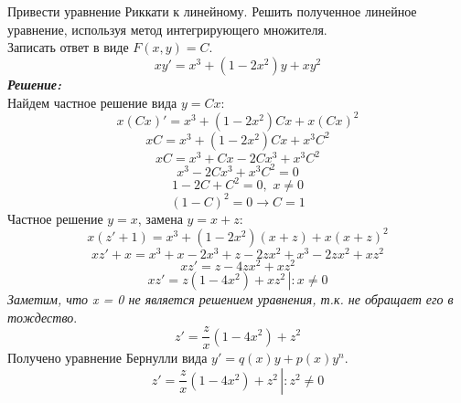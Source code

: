 \documentclass[a5paper, 10pt]{article}
\theoremstyle{definition}
\theoremstyle{plain}
\theoremstyle{remark}
\begin{document}
\section{}
Привести уравнение Риккати к линейному. Решить полученное линейное уравнение, используя метод интегрирующего множителя.\\
Записать ответ в виде $F(x, y) = C$.
\begin{equation*}
xy' = x^3 + (1 - 2x^2)y + xy^2
\end{equation*}
\textit{\textbf{Решение:}}\\
Найдем частное решение вида $y = Cx$:
\begin{equation*}
x \left(  Cx \right)' = x^3 + (1 - 2x^2) Cx + x\left(  Cx \right)^2
\end{equation*}
\begin{equation*}
x C = x^3 + (1 - 2x^2) Cx + x^3C^2
\end{equation*}
\begin{equation*}
x C = x^3 + Cx - 2Cx^3 + x^3C^2
\end{equation*}
\begin{equation*}
x^3 - 2Cx^3 + x^3C^2 = 0
\end{equation*}
\begin{equation*}
1 - 2C + C^2 = 0,  \, \, x \neq 0
\end{equation*}
\begin{equation*}
\left(1 - C \right)^2 = 0 \to C = 1
\end{equation*}
Частное решение  $y = x$, замена $y = x + z$:
\begin{equation*}
x(z' + 1) = x^3 + (1 - 2x^2)(x + z) + x(x + z)^2
\end{equation*}
\begin{equation*}
xz' + x = x^3 + x - 2x^3 + z - 2zx^2 + x^3 -2zx^2 +x z^2
\end{equation*}
\begin{equation*}
xz'  =  z - 4zx^2 +x z^2
\end{equation*}
\begin{equation*}
xz'  =  z (1 - 4x^2) +x z^2 \, \left| \right. : x \neq 0 
\end{equation*}
\textit{Заметим, что x = 0 не является решением уравнения, т.к. не обращает его в тождество}.
\begin{equation*}
z'  =  \frac{z}{x}(1 - 4x^2) + z^2 
\end{equation*} 
Получено уравнение Бернулли вида $y' = q(x)y + p(x) y^n$.
\begin{equation*}
z'  =  \frac{z}{x}(1 - 4x^2) + z^2  \, \left| \right. :  z^2 \neq 0 
\end{equation*} 
\end{document}
